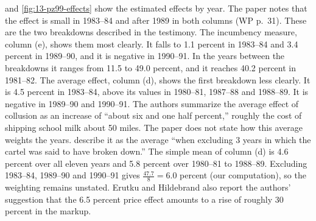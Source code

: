  and \cref{fig:13-pz99-effects} show the estimated effects by year. The paper notes that the
effect is small in 1983--84 and after 1989 in both columns (WP p.~31). These are the two breakdowns described in the
testimony. The incumbency measure, column (e), shows them most clearly. It falls to 1.1 percent in 1983--84 and 3.4
percent in 1989--90, and it is negative in 1990--91. In the years between the breakdowns it ranges from 11.5 to 49.0
percent, and it reaches 40.2 percent in 1981--82. The average effect, column (d), shows the first breakdown less
clearly. It is 4.5 percent in 1983--84, above its values in 1980--81, 1987--88 and 1988--89. It is negative in
1989--90 and 1990--91. The authors summarize the average effect of collusion as an
increase of ``about six and one half percent,'' roughly the cost of shipping school milk about 50 miles.
The paper does not state how this average weights the years. \citet[p.~235]{ErutkuHildebrand2010} describe it as
the average ``when excluding 3 years in which the cartel was said to have broken down.'' The simple mean of
column (d) is 4.6 percent over all eleven years and 5.8 percent over 1980--81 to 1988--89. Excluding 1983--84,
1989--90 and 1990--91 gives $\frac{47.7}{8} = 6.0$ percent (our computation), so the weighting remains unstated.
Erutku and Hildebrand also report the authors' suggestion that the 6.5 percent price effect amounts to a rise of
roughly 30 percent in the markup.

